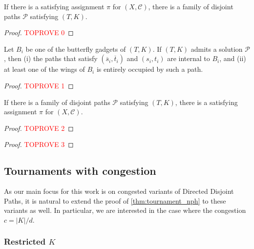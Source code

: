 \documentclass[a4paper,UKenglish,cleveref, autoref, thm-restate]{lipics-v2021}
\newcommand{\pname}[1]{{\sc #1}}
\newcommand{\ol}[1]{\overline{#1}}
\newcommand{\congestion}{c}
\begin{document}
  \begin{lemma}
    \label{lem:forward_tournament_nph}
    If there is a satisfying assignment $\pi$ for $(X, \mathcal{C})$, there is a family
    of disjoint paths $\mathcal{P}$ satisfying $(T, K)$.
  \end{lemma}

  \begin{proof}\textcolor{red}{TOPROVE 0}\end{proof}

  \begin{observation}
    \label{obs:busy_wing}
    Let $B_i$ be one of the butterfly gadgets of $(T, K)$. If $(T,K)$ admits a
    solution $\mathcal{P}$, then (i) the paths that satisfy $(\ol{s}_i, \ol{t}_i)$ and
    $(s_i, t_i)$ are internal to $B_i$, and (ii) at least one of the wings of $B_i$ is
    entirely occupied by such a path.
  \end{observation}

  \begin{proof}\textcolor{red}{TOPROVE 1}\end{proof}

  \begin{lemma}
    \label{lem:backward_tournament_nph}
    If there is a family of disjoint paths $\mathcal{P}$ satisfying $(T, K)$, there is
    a satisfying assignment $\pi$ for $(X, \mathcal{C})$.
  \end{lemma}

  \begin{proof}\textcolor{red}{TOPROVE 2}\end{proof}

  \tournamentnph*

  \begin{proof}\textcolor{red}{TOPROVE 3}\end{proof}

  \subsection{Tournaments with congestion}

  As our main focus for this work is on congested variants of \pname{Directed Disjoint
  Paths}, it is natural to extend the proof of \autoref{thm:tournament_nph} to these
  variants as well. In particular, we are interested in the case where the congestion $\congestion = |K|/d$.

  \subsubsection{Restricted $K$}
\end{document}
